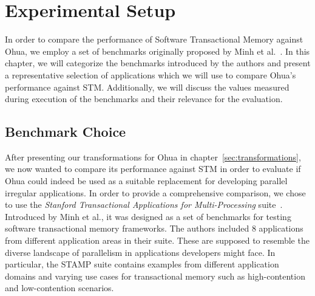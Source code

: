 %
\chapter{Experimental Setup}%
\label{sec:experiments}

In order to compare the performance of Software Transactional Memory against Ohua, we employ a set of benchmarks originally proposed by Minh et al.~\cite{minh2008stamp}.
In this chapter, we will categorize the benchmarks introduced by the authors and present a representative selection of applications which we will use to compare Ohua's performance against STM.
Additionally, we will discuss the values measured during execution of the benchmarks and their relevance for the evaluation.

\section{Benchmark Choice}
\label{sec:experiments:choice}

After presenting our transformations for Ohua in chapter~\ref{sec:transformations}, we now wanted to compare its performance against STM in order to evaluate if Ohua could indeed be used as a suitable replacement for developing parallel irregular applications.
In order to provide a comprehensive comparison, we chose to use the \emph{Stanford Transactional Applications for Multi-Processing} suite~\cite{minh2008stamp}.
Introduced by Minh et al., it was designed as a set of benchmarks for testing software transactional memory frameworks.
The authors included 8 applications from different application areas in their suite.
These are supposed to resemble the diverse landscape of parallelism in applications developers might face.
In particular, the STAMP suite contains examples from different application domains and varying use cases for transactional memory such as high-contention and low-contention scenarios.

